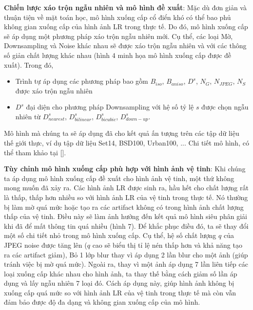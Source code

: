 \documentclass[conference]{IEEEtran}
\begin{document}
\textbf{Chiến lược xáo trộn ngẫu nhiên và mô hình đề xuất}: Mặc dù đơn giản và thuận tiện về mặt toán học, mô hình xuống cấp cổ điển khó có thể bao phủ không gian xuống cấp của hình ảnh LR trong thực tế. Do đó, mô hình xuống cấp sẽ áp dụng một phương pháp xáo trộn ngẫu nhiên mới. Cụ thể, các loại Mờ, Downsampling và Noise khác nhau sẽ được xáo trộn ngẫu nhiên và với các thông số giản chất lượng khác nhau (hình 4 minh họa mô hình xuống cấp được đề xuất). Trong đó,
\begin{itemize}
 \item Trình tự áp dụng các phương pháp bao gồm {${{B}_{iso}}$, ${{B}_{aniso}}$, ${{D}^{s}}$, ${{N}_{G}}$, ${{N}_{JPEG}}$, ${{N}_{S}}$} được xáo trộn ngẫu nhiên
 \item ${{D}^{s}}$ đại diện cho phương pháp Downsampling với hệ số tỷ lệ $s$ được chọn ngẫu nhiên từ {$D_{nearest}^{s}$, $D_{bilinear}^{s}$, $D_{bicubic}^{s}$, $D_{down-up}^{s}$}. 
\end{itemize}

Mô hình mà chúng ta sẽ áp dụng đã cho kết quả ấn tượng trên các tập dữ liệu thế giới thực, ví dụ tập dữ liệu Set14, BSD100, Urban100, ... Chi tiết mô hình, có thể tham khảo tại [].

\textbf{Tùy chỉnh mô hình xuống cấp phù hợp với hình ảnh vệ tinh}: Khi chúng ta áp dụng mô hình xuống cấp đề xuất cho hình ảnh vệ tinh, một thứ không mong muốn đã xảy ra. Các hình ảnh LR được sinh ra, hầu hết cho chất lượng rất là thấp, thấp hơn nhiều so với hình ảnh LR của vệ tinh trong thực tế. Nó thường bị làm mờ quá mức hoặc tạo ra các artifact không có trong hình ảnh chất lượng thấp của vệ tinh. Điều này sẽ làm ảnh hưởng đến kết quả mô hình siêu phân giải khi đã để mất thông tin quá nhiều (hình 7). Để khắc phục điều đó, ta sẽ thay đổi một số chi tiết nhỏ trong mô hình xuống cấp. Cụ thể, hệ số chất lượng $q$ của JPEG noise được tăng lên ($q$ cao sẽ biểu thị tỉ lệ nén thấp hơn và khả năng tạo ra các artifact giảm), Bỏ 1 lớp blur thay vì áp dụng 2 lần blur cho một ảnh (giúp tránh việc bị mờ quá mức). Ngoài ra, thay vì một ảnh áp dụng 7 lần liên tiếp các loại xuống cấp khác nhau cho hình ảnh, ta thay thế bằng cách giảm số lần áp dụng và lấy ngẫu nhiên 7 loại đó. Cách áp dụng này, giúp hình ảnh không bị xuống cấp quá mức so với hình ảnh LR của vệ tinh trong thực tế mà còn vẫn đảm bảo được độ đa dạng và không gian xuống cấp của mô hình.
\end{document}

